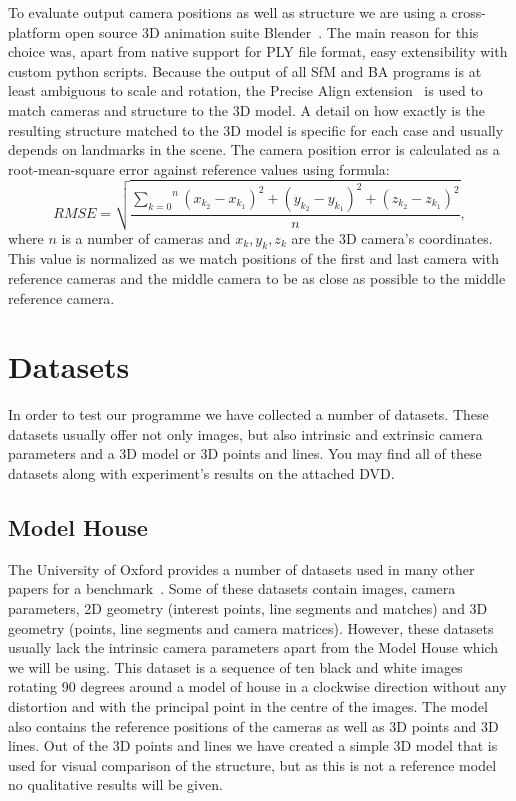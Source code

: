 \vspace{.5cm}
To evaluate output camera positions as well as structure we are using a cross-platform open source 3D animation suite Blender~\cite{www:blender}. The main reason for this choice was, apart from native support for PLY file format, easy extensibility with custom python scripts. Because the output of all SfM and BA programs is at least ambiguous to scale and rotation, the Precise Align extension~\cite{www:blender_precise_align} is used to match cameras and structure to the 3D model. A detail on how exactly is the resulting structure matched to the 3D model is specific for each case and usually depends on landmarks in the scene. The camera position error is calculated as a root-mean-square error against reference values using formula:
\begin{equation}
	RMSE=\sqrt{\frac{\overset{n}{\underset{k=0}{\sum}} (x_{k_2}-x_{k_1})^2 + (y_{k_2}-y_{k_1})^2 + (z_{k_2}-z_{k_1})^2}{n}},
	\label{eq:RMSE}
\end{equation}
where $n$ is a number of cameras and $x_{k}, y_k, z_k$ are the 3D camera's coordinates. This value is normalized as we match positions of the first and last camera with reference cameras and the middle camera to be as close as possible to the middle reference camera.

\section{Datasets}
\label{sec:experiments-datasets}
In order to test our programme we have collected a number of datasets. These datasets usually offer not only images, but also intrinsic and extrinsic camera parameters and a 3D model or 3D points and lines. You may find all of these datasets along with experiment's results on the attached DVD.

\subsection*{Model House}
The University of Oxford provides a number of  datasets used in many other papers for a benchmark~\cite{www:oxford_models}. Some of these datasets contain images, camera parameters, 2D geometry (interest points, line segments and matches) and 3D geometry (points, line segments and camera matrices). However, these datasets usually lack the intrinsic camera parameters apart from the Model House which we will be using. This dataset is a sequence of ten black and white images rotating 90 degrees around a model of house in a clockwise direction without any distortion and with the principal point in the centre of the images. The model also contains the reference positions of the cameras as well as 3D points and 3D lines. Out of the 3D points and lines we have created a simple 3D model that is used for visual comparison of the structure, but as this is not a reference model no qualitative results will be given.

